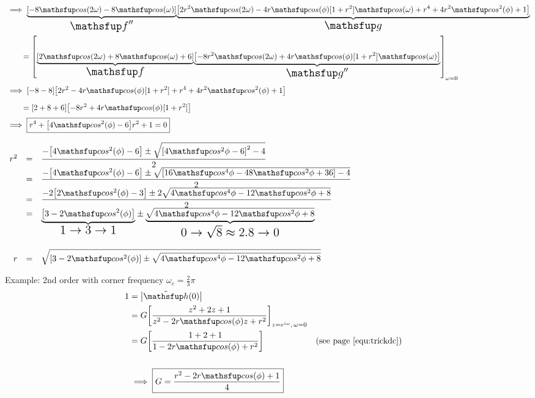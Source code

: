 {%
\newpage
\vfill
{\LARGE\begin{align*}
  &\implies \mcom{\brs{-8\cos(2\omega)  - 8\cos(\omega)}}
                 {\Large$\ff''$}
            \mcom{\brs{2r^2\cos(2\omega)  - 4r\cos(\phi)[1+r^2]\cos(\omega) +  r^4 +  4r^2\cos^2(\phi) + 1}}
                 {\Large$\fg$}
 \\&\qquad= \brs{\mcom{\brs{2\cos(2\omega)  + 8 \cos(\omega) +  6}}
                      {\Large$\ff$}
                 \mcom{\brs{-8r^2\cos(2\omega)  + 4r\cos(\phi)[1+r^2]\cos(\omega) }}
                      {\Large$\fg''$}
                   }_{\omega=0} 
  \\&\implies \brs{-8  - 8}      \brs{ 2r^2 - 4r\cos(\phi)[1+r^2] +  r^4 +  4r^2\cos^2(\phi) + 1}
       \\&\qquad= \brs{2  + 8  +  6} \brs{-8r^2 + 4r\cos(\phi)[1+r^2]}
  \\&\implies\boxed{r^4 + \brs{4\cos^2(\phi)-6} r^2 + 1 = 0 }
  \\
\end{align*}}

\newpage
\vfill
{\LARGE$\begin{array}{rc>{\ds}l}
  r^2 &=& \frac{-\brs{4\cos^2(\phi)-6} \pm \sqrt{\brs{4\cos^2\phi-6}^2 - 4}}{2}
    \\&=& \frac{-\brs{4\cos^2(\phi)-6} \pm \sqrt{\brs{16\cos^4\phi-48\cos^2\phi+36} - 4}}{2}
    \\&=& \frac{-2\brs{2\cos^2(\phi)-3} \pm 2\sqrt{4\cos^4\phi-12\cos^2\phi+8}}{2}
    \\&=& \mcom{\brs{3-2\cos^2(\phi)}}            {\Large$1\rightarrow      3        \rightarrow1$} 
     \pm \mcom{\sqrt{4\cos^4\phi-12\cos^2\phi+8}}{\Large$0\rightarrow\sqrt{8}\eqa2.8\rightarrow0$}
    \\\\
   r &=&\sqrt{\brs{3-2\cos^2(\phi)} \pm \sqrt{4\cos^4\phi-12\cos^2\phi+8}}
\end{array}$}
\hfill
{}
\\
\vfill\mbox{}

\newpage
Example: 2nd order  with corner frequency $\omega_c=\frac{2}{3}\pi$
\begin{align*}
  1 &= \abs{\Fh(0)}
  \\&= G\brs{\frac{z^2 + 2z            + 1}
                  {z^2 - 2r\cos(\phi)z + r^2}}_{z=e^{i\omega},\,\omega=0}
  \\&= G\brs{\frac{1   + 2             + 1}
                  {1   - 2r\cos(\phi)  + r^2}}
    && \text{(see \prefpo{equ:trickdc})}
  \\
  \\&\implies \boxed{G = \frac{r^2 - 2r\cos(\phi) + 1}{4}}
\end{align*}



}
